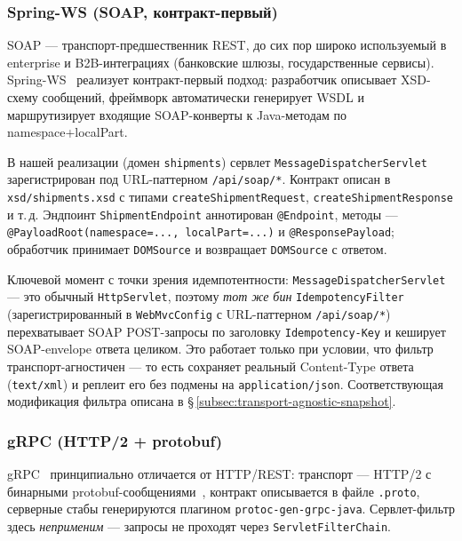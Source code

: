 \subsubsection{Spring-WS (SOAP, контракт-первый)}
\label{subsec:transport-soap}

SOAP --- транспорт-предшественник REST, до сих пор широко используемый в enterprise и B2B-интеграциях (банковские шлюзы, государственные сервисы). Spring-WS~\cite{spring-ws} реализует контракт-первый подход: разработчик описывает XSD-схему сообщений, фреймворк автоматически генерирует WSDL и маршрутизирует входящие SOAP-конверты к Java-методам по namespace+localPart.

В нашей реализации (домен \texttt{shipments}) сервлет \texttt{MessageDispatcherServlet} зарегистрирован под URL-паттерном \texttt{/api/soap/*}. Контракт описан в \texttt{xsd/shipments.xsd} с типами \texttt{createShipmentRequest}, \texttt{createShipmentResponse} и т.\,д. Эндпоинт \texttt{ShipmentEndpoint} аннотирован \texttt{@Endpoint}, методы --- \texttt{@PayloadRoot(namespace=..., localPart=...)} и \texttt{@ResponsePayload}; обработчик принимает \texttt{DOMSource} и возвращает \texttt{DOMSource} с ответом.

Ключевой момент с точки зрения идемпотентности: \texttt{MessageDispatcherServlet} --- это обычный \texttt{HttpServlet}, поэтому \emph{тот же бин} \texttt{IdempotencyFilter} (зарегистрированный в \texttt{WebMvcConfig} с URL-паттерном \texttt{/api/soap/*}) перехватывает SOAP POST-запросы по заголовку \texttt{Idempotency-Key} и кеширует SOAP-envelope ответа целиком. Это работает только при условии, что фильтр транспорт-агностичен --- то есть сохраняет реальный Content-Type ответа (\texttt{text/xml}) и реплеит его без подмены на \texttt{application/json}. Соответствующая модификация фильтра описана в \S\,\ref{subsec:transport-agnostic-snapshot}.

\subsubsection{gRPC (HTTP/2 + protobuf)}
\label{subsec:transport-grpc}

gRPC~\cite{grpc-java} принципиально отличается от HTTP/REST: транспорт --- HTTP/2 с бинарными protobuf-сообщениями~\cite{protobuf3}, контракт описывается в файле \texttt{.proto}, серверные стабы генерируются плагином \texttt{protoc-gen-grpc-java}. Сервлет-фильтр здесь \emph{неприменим} --- запросы не проходят через \texttt{ServletFilterChain}.

